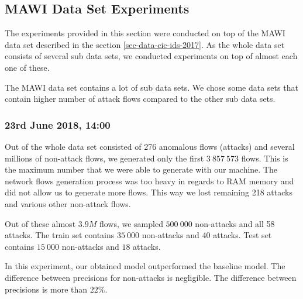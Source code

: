 \documentclass{article}
\begin{document}
\clearpage

\subsection{MAWI Data Set Experiments}\label{sec-mawi-experiments}


The experiments provided in this section were conducted on top of the MAWI data set described in the section \ref{sec-data-cic-ids-2017}. As the whole data set consists of several sub data sets, we conducted experiments on top of almost each one of these.

The MAWI data set contains a lot of sub data sets. We chose some data sets that contain higher number of attack flows compared to the other sub data sets.

\subsubsection{23rd June 2018, 14:00}

Out of the whole data set consisted of 276 anomalous flows (attacks) and several millions of non-attack flows, we generated only the first $3\ 857\ 573$ flows. This is the maximum number that we were able to generate with our machine. The network flows generation process was too heavy in regards to RAM memory and did not allow us to generate more flows. This way we lost remaining 218 attacks and various other non-attack flows.

Out of these almost $3.9M$ flows, we sampled $500\ 000$ non-attacks and all 58 attacks. The train set contains $35\ 000$ non-attacks and $40$ attacks. Test set contains $15\ 000$ non-attacks and $18$ attacks.

In this experiment, our obtained model outperformed the baseline model. The difference between precisions for non-attacks is negligible. The difference between precisions is more than $22\%$.
\end{document}

